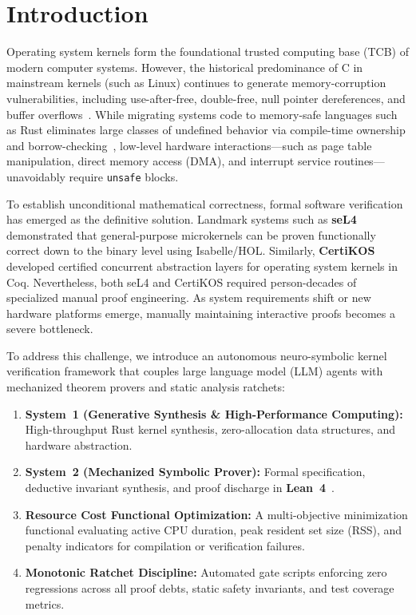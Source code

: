 \documentclass[10pt,twocolumn,letterpaper]{article}
\theoremstyle{definition}
\begin{document}
\section{Introduction}
\label{sec:introduction}

Operating system kernels form the foundational trusted computing base (TCB) of modern computer systems. However, the historical predominance of C in mainstream kernels (such as Linux) continues to generate memory-corruption vulnerabilities, including use-after-free, double-free, null pointer dereferences, and buffer overflows~\citep{ojeda2021rustforlinux}. While migrating systems code to memory-safe languages such as Rust eliminates large classes of undefined behavior via compile-time ownership and borrow-checking~\citep{jung2017rustbelt,asterinas2023framekernel}, low-level hardware interactions---such as page table manipulation, direct memory access (DMA), and interrupt service routines---unavoidably require \texttt{unsafe} blocks.

To establish unconditional mathematical correctness, formal software verification has emerged as the definitive solution. Landmark systems such as \textbf{seL4}~\citep{klein2009sel4} demonstrated that general-purpose microkernels can be proven functionally correct down to the binary level using Isabelle/HOL. Similarly, \textbf{CertiKOS}~\citep{gu2016certikos} developed certified concurrent abstraction layers for operating system kernels in Coq. Nevertheless, both seL4 and CertiKOS required person-decades of specialized manual proof engineering. As system requirements shift or new hardware platforms emerge, manually maintaining interactive proofs becomes a severe bottleneck.

To address this challenge, we introduce an autonomous neuro-symbolic kernel verification framework that couples large language model (LLM) agents with mechanized theorem provers and static analysis ratchets:
\begin{enumerate}
    \item \textbf{System~1 (Generative Synthesis \& High-Performance Computing):} High-throughput Rust kernel synthesis, zero-allocation data structures, and hardware abstraction.
    \item \textbf{System~2 (Mechanized Symbolic Prover):} Formal specification, deductive invariant synthesis, and proof discharge in \textbf{Lean~4}~\citep{demoura2021lean4}.
    \item \textbf{Resource Cost Functional Optimization:} A multi-objective minimization functional evaluating active CPU duration, peak resident set size (RSS), and penalty indicators for compilation or verification failures.
    \item \textbf{Monotonic Ratchet Discipline:} Automated gate scripts enforcing zero regressions across all proof debts, static safety invariants, and test coverage metrics.
\end{enumerate}
\end{document}
